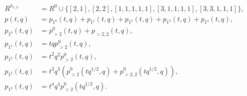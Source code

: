 \documentclass[a4paper, 12pt, reqno]{amsart}
\begin{document}
\begin{align*}
  R^{h_{1, 3}} &= R^0 \cup \{[2, 1], [2, 2], [1, 1, 1, 1, 1], [3, 1, 1, 1, 1], [3, 3, 1, 1, 1]\}, \\
  p(t, q) &= p_{1^0}(t, q) + p_{1^1}(t, q) + p_{1^2}(t, q) + p_{1^3}(t, q) + p_{1^4}(t, q), \\
  p_{1^0}(t, q) &= p^0_{>2}(t, q) + p_{>2, 2}(t, q), \\
  p_{1^1}(t, q) &= tqp^0_{>2}(t, q), \\
  p_{1^2}(t, q) &= t^2q^2p^0_{>2}(t, q), \\
  p_{1^3}(t, q) &= t^3q^3(p^0_{>2}(tq^{1/2}, q) + p^0_{>2, 2}(tq^{1/2}, q)), \\
  p_{1^4}(t, q) &= t^4q^4p^0_{>2}(tq^{1/2}, q).
\end{align*}
\end{document}
